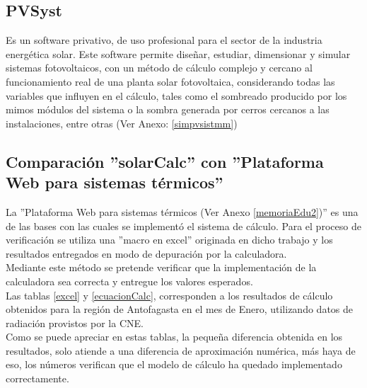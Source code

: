 \subsection{PVSyst}
Es un software privativo, de uso profesional para el sector de la industria energética solar. Este software permite diseñar, estudiar, dimensionar y simular sistemas fotovoltaicos, con un método de cálculo complejo y cercano al funcionamiento real de una planta solar fotovoltaica, considerando todas las variables que influyen en el cálculo, tales como el sombreado producido por los mimos módulos del sistema o la sombra generada por cerros cercanos a las instalaciones, entre otras (Ver Anexo: \ref{simpvsistmm})\\

\subsection{Comparación ''solarCalc'' con ''Plataforma Web para sistemas térmicos''}
La ''Plataforma Web para sistemas térmicos (Ver Anexo \ref{memoriaEdu2})'' es una de las bases con las cuales se implementó el sistema de cálculo. Para el proceso de verificación se utiliza una ''macro en excel'' originada en dicho trabajo y los resultados entregados en modo de depuración por la calculadora.\\
Mediante este método se pretende verificar que la implementación de la calculadora sea correcta y entregue los valores esperados.\\

Las tablas \ref{excel} y \ref{ecuacionCalc}, corresponden a los resultados de cálculo obtenidos para la región de Antofagasta en el mes de Enero, utilizando datos de radiación provistos por la CNE.\\
Como se puede apreciar en estas tablas, la pequeña diferencia obtenida en los resultados, solo atiende a una diferencia de aproximación numérica, más haya de eso, los números verifican que el modelo de cálculo ha quedado implementado correctamente.

